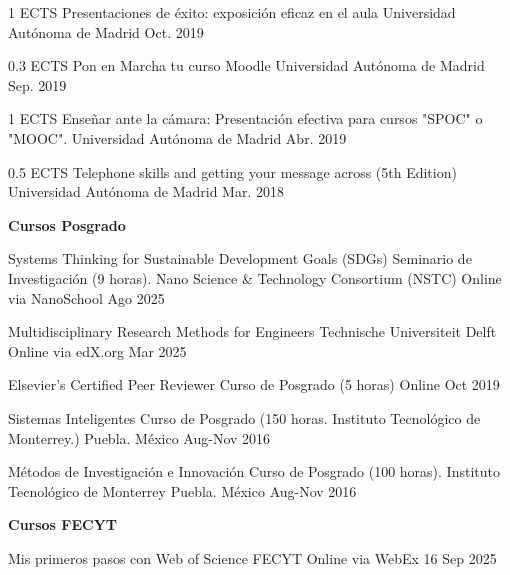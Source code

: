 \begin{cventries}
	\cventry
	{1 ECTS} %
	{Presentaciones de éxito: exposición eficaz en el aula} %
	{Universidad Autónoma de Madrid} %
	{Oct. 2019} %
	{}
	
	\cventry
	{0.3 ECTS} %
	{Pon en Marcha tu curso Moodle} %
	{Universidad Autónoma de Madrid} %
	{Sep. 2019} %
	{}
	
	\cventry
	{1 ECTS} %
	{Enseñar ante la cámara: Presentación efectiva para cursos "SPOC" o
		"MOOC".} %
	{Universidad Autónoma de Madrid} %
	{Abr. 2019} %
	{}
	
	\cventry
	{0.5 ECTS} %
	{Telephone skills and getting your message across (5th Edition)} %
	{Universidad Autónoma de Madrid} %
	{Mar. 2018} %
	{}
	
\end{cventries}


\textbf{Cursos Posgrado}
\begin{cvhonors}
   \cvhonor
	{Systems Thinking for Sustainable Development Goals (SDGs)} %
	{Seminario de Investigación (9 horas). Nano Science \& Technology Consortium (NSTC)} %
	{Online via NanoSchool} %
	{Ago 2025} %

   \cvhonor
	{Multidisciplinary Research Methods for Engineers} %
	{Technische Universiteit Delft} %
	{Online via edX.org} %
	{Mar 2025} %
	
   \cvhonor
	{Elsevier’s Certified Peer Reviewer} %
	{Curso de Posgrado (5 horas)} %
	{Online} %
	{Oct 2019} %

   \cvhonor
	{Sistemas Inteligentes} %
	{Curso de Posgrado (150 horas. Instituto Tecnológico de Monterrey.)} %
	{Puebla. México} %
	{Aug-Nov 2016} %
	
   \cvhonor
	{Métodos de Investigación e Innovación} %
	{Curso de Posgrado (100 horas). Instituto Tecnológico de Monterrey} %
	{Puebla. México} %
	{Aug-Nov 2016} %
\end{cvhonors}

\textbf{Cursos FECYT}

\begin{cvhonors}
   \cvhonor
   {Mis primeros pasos con Web of Science} %
   {FECYT} %
   {Online via WebEx} %
   {16 Sep 2025} %
\end{cvhonors}

